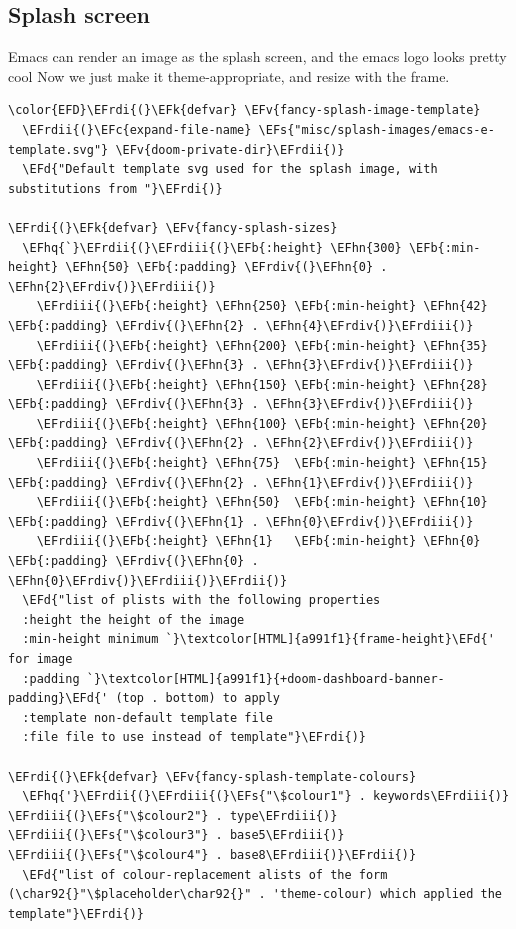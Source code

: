 \documentclass{scrartcl}
\newcommand{\EFk}[1]{\textcolor{EFk}{#1}} %
\newcommand{\EFd}[1]{\textcolor{EFd}{#1}} %
\newcommand{\EFs}[1]{\textcolor{EFs}{#1}} %
\newcommand{\EFb}[1]{\textcolor{EFb}{#1}} %
\newcommand{\EFc}[1]{\textcolor{EFc}{#1}} %
\newcommand{\EFv}[1]{\textcolor{EFv}{#1}} %
\newcommand{\EFhn}[1]{#1} %
\newcommand{\EFhq}[1]{#1} %
\newcommand{\EFrdi}[1]{#1} %
\newcommand{\EFrdii}[1]{#1} %
\newcommand{\EFrdiii}[1]{#1} %
\newcommand{\EFrdiv}[1]{#1} %
\begin{document}
\subsection{Splash screen}
\label{sec:org2bd8207}
Emacs can render an image as the splash screen, and the emacs logo looks pretty cool
Now we just make it theme-appropriate, and resize with the frame.
\begin{Code}
\begin{Verbatim}[]
\color{EFD}\EFrdi{(}\EFk{defvar} \EFv{fancy-splash-image-template}
  \EFrdii{(}\EFc{expand-file-name} \EFs{"misc/splash-images/emacs-e-template.svg"} \EFv{doom-private-dir}\EFrdii{)}
  \EFd{"Default template svg used for the splash image, with substitutions from "}\EFrdi{)}

\EFrdi{(}\EFk{defvar} \EFv{fancy-splash-sizes}
  \EFhq{`}\EFrdii{(}\EFrdiii{(}\EFb{:height} \EFhn{300} \EFb{:min-height} \EFhn{50} \EFb{:padding} \EFrdiv{(}\EFhn{0} . \EFhn{2}\EFrdiv{)}\EFrdiii{)}
    \EFrdiii{(}\EFb{:height} \EFhn{250} \EFb{:min-height} \EFhn{42} \EFb{:padding} \EFrdiv{(}\EFhn{2} . \EFhn{4}\EFrdiv{)}\EFrdiii{)}
    \EFrdiii{(}\EFb{:height} \EFhn{200} \EFb{:min-height} \EFhn{35} \EFb{:padding} \EFrdiv{(}\EFhn{3} . \EFhn{3}\EFrdiv{)}\EFrdiii{)}
    \EFrdiii{(}\EFb{:height} \EFhn{150} \EFb{:min-height} \EFhn{28} \EFb{:padding} \EFrdiv{(}\EFhn{3} . \EFhn{3}\EFrdiv{)}\EFrdiii{)}
    \EFrdiii{(}\EFb{:height} \EFhn{100} \EFb{:min-height} \EFhn{20} \EFb{:padding} \EFrdiv{(}\EFhn{2} . \EFhn{2}\EFrdiv{)}\EFrdiii{)}
    \EFrdiii{(}\EFb{:height} \EFhn{75}  \EFb{:min-height} \EFhn{15} \EFb{:padding} \EFrdiv{(}\EFhn{2} . \EFhn{1}\EFrdiv{)}\EFrdiii{)}
    \EFrdiii{(}\EFb{:height} \EFhn{50}  \EFb{:min-height} \EFhn{10} \EFb{:padding} \EFrdiv{(}\EFhn{1} . \EFhn{0}\EFrdiv{)}\EFrdiii{)}
    \EFrdiii{(}\EFb{:height} \EFhn{1}   \EFb{:min-height} \EFhn{0}  \EFb{:padding} \EFrdiv{(}\EFhn{0} . \EFhn{0}\EFrdiv{)}\EFrdiii{)}\EFrdii{)}
  \EFd{"list of plists with the following properties
  :height the height of the image
  :min-height minimum `}\textcolor[HTML]{a991f1}{frame-height}\EFd{' for image
  :padding `}\textcolor[HTML]{a991f1}{+doom-dashboard-banner-padding}\EFd{' (top . bottom) to apply
  :template non-default template file
  :file file to use instead of template"}\EFrdi{)}

\EFrdi{(}\EFk{defvar} \EFv{fancy-splash-template-colours}
  \EFhq{'}\EFrdii{(}\EFrdiii{(}\EFs{"\$colour1"} . keywords\EFrdiii{)} \EFrdiii{(}\EFs{"\$colour2"} . type\EFrdiii{)} \EFrdiii{(}\EFs{"\$colour3"} . base5\EFrdiii{)} \EFrdiii{(}\EFs{"\$colour4"} . base8\EFrdiii{)}\EFrdii{)}
  \EFd{"list of colour-replacement alists of the form (\char92{}"\$placeholder\char92{}" . 'theme-colour) which applied the template"}\EFrdi{)}


\end{Verbatim}
\end{Code}
\end{document}
